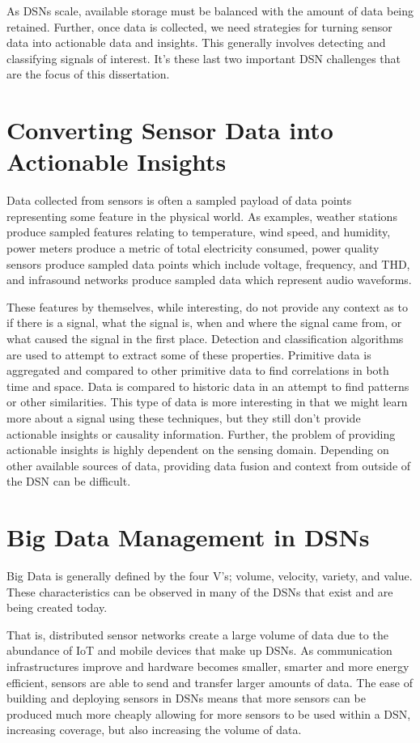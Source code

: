 As DSNs scale, available storage must be balanced with the amount of data being retained. Further, once data is collected, we need strategies for turning sensor data into actionable data and insights. This generally involves detecting and classifying signals of interest. It's these last two important DSN challenges that are the focus of this dissertation.

\section{Converting Sensor Data into Actionable Insights}
Data collected from sensors is often a sampled payload of data points representing some feature in the physical world. As examples, weather stations produce sampled features relating to temperature, wind speed, and humidity, power meters produce a metric of total electricity consumed, power quality sensors produce sampled data points which include voltage, frequency, and THD, and infrasound networks produce sampled data which represent audio waveforms.

These features by themselves, while interesting, do not provide any context as to if there is a signal, what the signal is, when and where the signal came from, or what caused the signal in the first place. Detection and classification algorithms are used to attempt to extract some of these properties. Primitive data is aggregated and compared to other primitive data to find correlations in both time and space. Data is compared to historic data in an attempt to find patterns or other similarities. This type of data is more interesting in that we might learn more about a signal using these techniques, but they still don't provide actionable insights or causality information. Further, the problem of providing actionable insights is highly dependent on the sensing domain. Depending on other available sources of data, providing data fusion and context from outside of the DSN can be difficult.

\section{Big Data Management in DSNs}
Big Data is generally defined by the four V's; volume, velocity, variety, and value. These characteristics can be observed in many of the DSNs that exist and are being created today.

That is, distributed sensor networks create a large volume of data due to the abundance of IoT and mobile devices that make up DSNs. As communication infrastructures improve and hardware becomes smaller, smarter and more energy efficient, sensors are able to send and transfer larger amounts of data. The ease of building and deploying sensors in DSNs means that more sensors can be produced much more cheaply allowing for more sensors to be used within a DSN, increasing coverage, but also increasing the volume of data.

